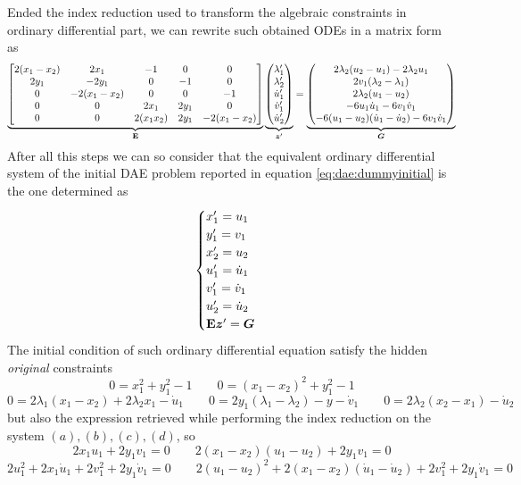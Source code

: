 	Ended the index reduction used to transform the algebraic constraints in ordinary differential part, we can rewrite such obtained ODEs in a matrix form as
	\[ \underbrace{ \begin{bmatrix}  2(x_1-x_2) & 2x_1 & - 1 & 0 & 0 \\
	2y_1 & -2y_1 & 0 & - 1 & 0 \\
	0 & -2(x_1-x_2) & 0 & 0 & -1 \\ 
	0 & 0 & 2x_1 & 2y_1 & 0 \\
	0 & 0 & 2(x_1 x_2) & 2y_1 & - 2(x_1 - x_2)  \end{bmatrix} }_{\mathbf{E}} \underbrace{\begin{pmatrix} \lambda_1' \\ \lambda_2' \\ \dot u_1' \\ \dot v_1' \\ \dot u_2' \end{pmatrix}}_{\boldsymbol{z}'} = \underbrace{\begin{pmatrix} 2\lambda_2 (u_2-u_1) - 2 \lambda_2 u_1 \\
	2v_1(\lambda_2 - \lambda_1) \\ 2 \lambda_2 (u_1- u_2) \\ -6u_1 \dot u_1 - 6v_1 \dot v_1 \\ - 6(u_1-u_2)(\dot u_1 - \dot u_2) - 6 v_1 \dot v_1 \end{pmatrix} }_{\boldsymbol{G}} \]
	After all this steps we can so consider that the equivalent ordinary differential system of the initial DAE problem reported in equation \ref{eq:dae:dummyinitial} is the one determined as
	\begin{equation}
	\begin{cases}
		x_1' = u_1 \\ y_1' = v_1 \\ x_2' = u_2 \\ u_1' = \dot u_1 \\ v_1' = \dot v_1 \\ u_2' = \dot u_2 \\
		\mathbf{E} \boldsymbol{z}' = \boldsymbol{G}
	\end{cases}
	\end{equation}
	The initial condition of such ordinary differential equation satisfy the hidden \textit{original} constraints
	\[ 0 = x_1^2 + y_1^2 - 1 \qquad 0 = (x_1-x_2)^2 + y_1^2 - 1 \]
	\[ 0 = 2\lambda_1(x_1-x_2) + 2 \lambda_2 x_1 - \dot u_1 \qquad 0 = 2y_1(\lambda_1-\lambda_2) - y - \dot v_1 \qquad 0 =  2\lambda_2 (x_2-x_1) - \dot u_2  \]
	but also the expression retrieved while performing the index reduction on the system $(a),(b),(c),(d)$, so
	\[ 2x_1u_1 + 2 y_1 v_1 = 0 \qquad 2(x_1-x_2)(u_1-u_2) + 2 y_1 v_1 = 0 \]
	\[ 2 u_1^2 + 2x_1 \dot u_1 + 2 v_1^2 + 2 y_1 \dot v_1 = 0 \qquad 2 (u_1 - u_2)^2 + 2 (x_1 - x_2)(\dot u_1 - \dot u_2) +2 v_1^2 +2 y_1 \dot v_1 = 0   \]
	
	
	
	
	
	